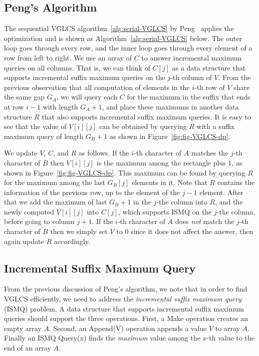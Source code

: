 \subsection{Peng's Algorithm}

The sequential VGLCS algorithm~\ref{alg:serial-VGLCS} by
Peng~\cite{Peng2011TheLC} applies the optimization and is shown as
Algorithm~\ref{alg:serial-VGLCS} below.  The outer loop goes through
every row, and the inner loop goes through every element of a row from
left to right.  We use an array of $C$ to answer incremental maximum
queries on all columns.  That is, we can think of $C[j]$ as a data
structure that supports incremental suffix maximum queries on the
$j$-th column of $V$.  From the previous observation that all
computation of elements in the $i$-th row of $V$ share the same gap
$G_A$, we will query each $C$ for the maximum in the suffix that ends
at row $i-1$ with length $G_A + 1$, and place these maximums in
another data structure $R$ that also supports incremental suffix
maximum queries.  It is easy to see that the value of $V[i][j]$ can be
obtained by querying $R$ with a suffix maximum query of length $G_B +
1$ as shown in Figure~\ref{fig:fig-VGLCS-dp}.

We update $V$, $C$, and $R$ as follows.  If the $i$-th character of
$A$ matches the $j$-th character of $B$ then $V[i][j]$ is the maximum
among the rectangle plus 1, as shown in Figure~\ref{fig:fig-VGLCS-dp}.
This maximum can be found by querying $R$ for the maximum among the
last $G_B[j]$ elements in it.  Note that $R$ contains the information
of the previous row, up to the element of the $j-1$ element.  After
that we add the maximum of last $G_B + 1$ in the $j$-the column into
$R$, and the newly computed $V[i][j]$ into $C[j]$, which supports ISMQ
on the $j$-the column, before going to column $j + 1$.  If the $i$-th
character of $A$ does {\em not} match the $j$-th character of $B$ then
we simply set $V$ to 0 since it does not affect the answer, then again
update $R$ accordingly.
 


\subsection{Incremental Suffix Maximum Query}

From the previous discussion of Peng's algorithm, we note that in
order to find VGLCS efficiently, we need to address the {\em
  incremental suffix maximum query} (ISMQ) problem.  A data structure
that supports incremental suffix maximum queries should support the
three operations.  First, a {\sc Make} operation creates an empty
array $A$. Second, an {\sc Append(V)} operation appends a value $V$ to
array $A$. Finally an ISMQ {\sc Query(x)} finds the {\em maximum}
value among the $x$-th value to the end of an array $A$.

